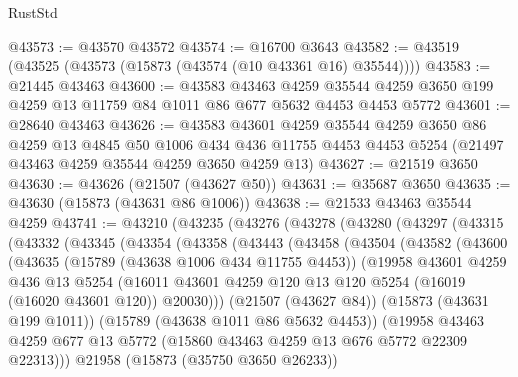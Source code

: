 \begin{lexlean}{RustStd}
\begin{coremodule}
@43573 := @43570 @43572
@43574 := @16700 @3643
@43582 := @43519 (@43525 (@43573 (@15873 (@43574 (@10 @43361 @16) @35544))))
@43583 := @21445 @43463
@43600 := @43583
    @43463
    @4259
    @35544
    @4259
    @3650
    @199
    @4259
    @13
    @11759
    @84
    @1011
    @86
    @677
    @5632
    @4453
    @4453
    @5772
@43601 := @28640 @43463
@43626 := @43583
    @43601
    @4259
    @35544
    @4259
    @3650
    @86
    @4259
    @13
    @4845
    @50
    @1006
    @434
    @436
    @11755
    @4453
    @4453
    @5254
    (@21497 @43463 @4259 @35544 @4259 @3650 @4259 @13)
@43627 := @21519 @3650
@43630 := @43626 (@21507 (@43627 @50))
@43631 := @35687 @3650
@43635 := @43630 (@15873 (@43631 @86 @1006))
@43638 := @21533 @43463 @35544 @4259
@43741 := @43210
    (@43235
      (@43276
        (@43278
          (@43280
            (@43297
              (@43315
                (@43332
                  (@43345
                    (@43354
                      (@43358
                        (@43443
                          (@43458
                            (@43504
                              (@43582
                                (@43600
                                  (@43635
                                    (@15789 (@43638 @1006 @434 @11755 @4453))
                                    (@19958
                                      @43601
                                      @4259
                                      @436
                                      @13
                                      @5254
                                      (@16011
                                        @43601
                                        @4259
                                        @120
                                        @13
                                        @120
                                        @5254
                                        (@16019 (@16020 @43601 @120))
                                        @20030)))
                                  (@21507 (@43627 @84))
                                  (@15873 (@43631 @199 @1011))
                                  (@15789 (@43638 @1011 @86 @5632 @4453))
                                  (@19958
                                    @43463
                                    @4259
                                    @677
                                    @13
                                    @5772
                                    (@15860 @43463 @4259 @13 @676 @5772 @22309 @22313)))
                                @21958
                                (@15873 (@35750 @3650 @26233))

\end{coremodule}
\end{lexlean}
